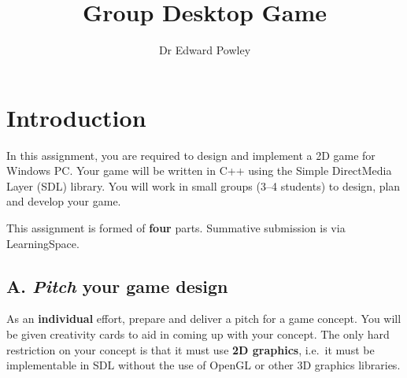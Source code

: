 \documentclass{../fal_assignment}
\title{Group Desktop Game}
\author{Dr Edward Powley}
\begin{document}
\maketitle
%    
\section*{Introduction}

In this assignment, you are required to design and implement a 2D game for Windows PC.
Your game will be written in C++ using the Simple DirectMedia Layer (SDL) library.
You will work in small groups (3--4 students) to design, plan and develop your game.


This assignment is formed of \textbf{four} parts.
Summative submission is via LearningSpace.

\subsection*{A. \emph{Pitch} your game design}

As an \textbf{individual} effort, prepare and deliver a pitch for a game concept.
You will be given creativity cards to aid in coming up with your concept.
The only hard restriction on your concept is that it must use \textbf{2D graphics},
i.e.\ it must be implementable in SDL without the use of OpenGL or other 3D graphics libraries.
\end{document}
